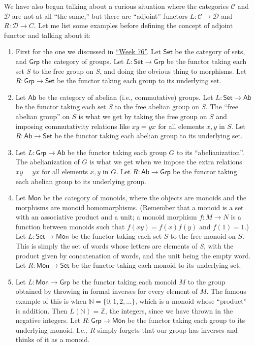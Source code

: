 \documentclass{article}
\def\tightlist{}
\begin{document}
We have also begun talking about a curious situation where the
categories \(\mathcal{C}\) and \(\mathcal{D}\) are not at all ``the
same,'' but there are ``adjoint'' functors
\(L\colon\mathcal{C}\to\mathcal{D}\) and \(R\colon\mathcal{D}\to C\).
Let me list some examples before defining the concept of adjoint functor
and talking about it:

\begin{enumerate}
\def\labelenumi{\arabic{enumi}.}
\tightlist
\item
  First for the one we discussed in \protect\hyperlink{week76}{``Week
  76''}. Let \(\mathsf{Set}\) be the category of sets, and
  \(\mathsf{Grp}\) the category of groups. Let
  \(L\colon\mathsf{Set}\to\mathsf{Grp}\) be the functor taking each set
  \(S\) to the free group on \(S\), and doing the obvious thing to
  morphisms. Let \(R\colon\mathsf{Grp}\to\mathsf{Set}\) be the functor
  taking each group to its underlying set.
\item
  Let \(\mathsf{Ab}\) be the category of abelian (i.e., commutative)
  groups. Let \(L\colon\mathsf{Set}\to\mathsf{Ab}\) be the functor
  taking each set \(S\) to the free abelian group on \(S\). The ``free
  abelian group'' on \(S\) is what we get by taking the free group on
  \(S\) and imposing commutativity relations like \(xy = yx\) for all
  elements \(x,y\) in \(S\). Let \(R\colon\mathsf{Ab}\to\mathsf{Set}\)
  be the functor taking each abelian group to its underlying set.
\item
  Let \(L\colon\mathsf{Grp}\to\mathsf{Ab}\) be the functor taking each
  group \(G\) to its ``abelianization''. The abelianization of \(G\) is
  what we get when we impose the extra relations \(xy = yx\) for all
  elements \(x,y\) in \(G\). Let \(R\colon\mathsf{Ab}\to\mathsf{Grp}\)
  be the functor taking each abelian group to its underlying group.
\item
  Let \(\mathsf{Mon}\) be the category of monoids, where the objects are
  monoids and the morphisms are monoid homomorphisms. (Remember that a
  monoid is a set with an associative product and a unit; a monoid
  morphism \(f\colon M\to N\) is a function between monoids such that
  \(f(xy) = f(x)f(y)\) and \(f(1) = 1\).) Let
  \(L\colon\mathsf{Set}\to\mathsf{Mon}\) be the functor taking each set
  \(S\) to the free monoid on \(S\). This is simply the set of words
  whose letters are elements of \(S\), with the product given by
  concatenation of words, and the unit being the empty word. Let
  \(R\colon\mathsf{Mon}\to\mathsf{Set}\) be the functor taking each
  monoid to its underlying set.
\item
  Let \(L\colon\mathsf{Mon}\to\mathsf{Grp}\) be the functor taking each
  monoid \(M\) to the group obtained by throwing in formal inverses for
  every element of \(M\). The famous example of this is when
  \(\mathbb{N} = \{0,1,2,...\}\), which is a monoid whose ``product'' is
  addition. Then \(L(\mathbb{N}) = \mathbb{Z}\), the integers, since we
  have thrown in the negative integers. Let
  \(R\colon\mathsf{Grp}\to\mathsf{Mon}\) be the functor taking each
  group to its underlying monoid. I.e., \(R\) simply forgets that our
  group has inverses and thinks of it as a monoid.
\end{enumerate}
\end{document}
